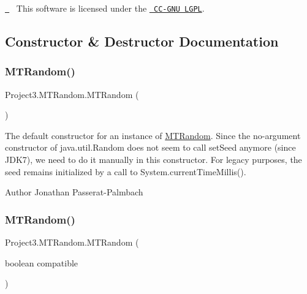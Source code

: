 \href{http://creativecommons.org/licenses/LGPL/2.1/}{\texttt{ }}~\newline
 This software is licensed under the \href{http://creativecommons.org/licenses/LGPL/2.1/}{\texttt{ C\+C-\/\+G\+NU L\+G\+PL}}. 

\subsection{Constructor \& Destructor Documentation}
\mbox{\label{class_project3_1_1_m_t_random_a53aed3686fa87293ed7b65b706086dab}} 
\subsubsection{\texorpdfstring{MTRandom()}{MTRandom()}\hspace{0.1cm}{\footnotesize\ttfamily [1/5]}}
{\footnotesize\ttfamily Project3.\+M\+T\+Random.\+M\+T\+Random (\begin{DoxyParamCaption}{ }\end{DoxyParamCaption})}

The default constructor for an instance of \mbox{\hyperlink{class_project3_1_1_m_t_random}{M\+T\+Random}}. Since the no-\/argument constructor of java.\+util.\+Random does not seem to call set\+Seed anymore (since J\+D\+K7), we need to do it manually in this constructor. For legacy purposes, the seed remains initialized by a call to System.\+current\+Time\+Millis(). \begin{DoxyAuthor}{Author}
Jonathan Passerat-\/\+Palmbach 
\end{DoxyAuthor}
\mbox{\label{class_project3_1_1_m_t_random_acf5fc01aeb0d6edfaf1c514159e7d1db}} 
\subsubsection{\texorpdfstring{MTRandom()}{MTRandom()}\hspace{0.1cm}{\footnotesize\ttfamily [2/5]}}
{\footnotesize\ttfamily Project3.\+M\+T\+Random.\+M\+T\+Random (\begin{DoxyParamCaption}\item[{boolean}]{compatible }\end{DoxyParamCaption})}

